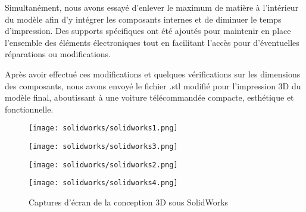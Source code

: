 Simultanément, nous avons essayé d'enlever le maximum de matière à l'intérieur du modèle afin d'y intégrer les composants internes et de diminuer le temps d'impression. Des supports spécifiques ont été ajoutés pour maintenir en place l'ensemble des éléments électroniques tout en facilitant l'accès pour d'éventuelles réparations ou modifications.

\newpage

Après avoir effectué ces modifications et quelques vérifications sur les dimensions des composants, nous avons envoyé le fichier .stl modifié pour l'impression 3D du modèle final, aboutissant à une voiture télécommandée compacte, esthétique et fonctionnelle.

\bigbreak
\begin{figure}[h]
    \begin{minipage}[c]{.46\linewidth}
        \centering
        \texttt{[image: solidworks/solidworks1.png]}
    	\label{fig:Vue principale conception 3D}
    \end{minipage}
    \hfill%
    \begin{minipage}[c]{.46\linewidth}
        \centering
        \texttt{[image: solidworks/solidworks3.png]}
    	\label{fig:Vue de côté conception 3D}
    \end{minipage}
    \begin{minipage}[c]{.46\linewidth}
        \centering
        \texttt{[image: solidworks/solidworks2.png]}
    	\label{fig:Vue du dessous 2 conception 3D}
    \end{minipage}
    \hfill%
    \begin{minipage}[c]{.46\linewidth}
        \centering
       	\texttt{[image: solidworks/solidworks4.png]}
    	\label{fig:Vue du dessous conception 3D}
    \end{minipage}
    \caption{Captures d'écran de la conception 3D sous SolidWorks}
\end{figure}

\newpage